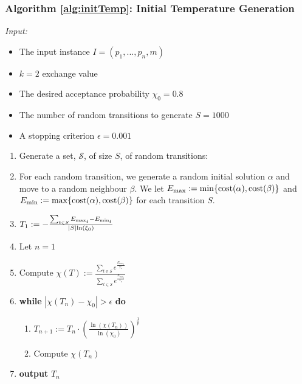 \documentclass[12pt,a4paper,reqno]{article}
\begin{document}
\subsubsection*{Algorithm \ref{alg:initTemp}: Initial Temperature Generation}
\label{alg:initTemp}
\emph{Input:}
\begin{itemize}
  \item The input instance $I=(p_1,...,p_n,m)$
  \item $k=2$ exchange value
  \item The desired acceptance probability $\chi_0 = 0.8$
  \item The number of random transitions to generate $S = 1000$
  \item A stopping criterion $\epsilon = 0.001$
\end{itemize}
\begin{enumerate}
  \item Generate a set, $\mathcal{S}$, of size $S$, of random transitions:
  \item[] For each random transition, we generate a random initial solution $\alpha$ and move to a random neighbour $\beta$. We let $E_\textnormal{max} := \min\{\textnormal{cost}(\alpha),\textnormal{cost}(\beta)\}$ and $E_{\textnormal{min}} := \max\{\textnormal{cost}(\alpha),\textnormal{cost}(\beta)\}$ for each transition $S$.
  \item $T_1:= - \frac{\sum_{t \in S} E_{\textnormal{max}_t} - E_{\textnormal{min}_t}}{|S| \textnormal{ln}(\xi_0)}$
  \item[] Let $n=1$
  \item[] Compute $\chi(T):=\frac{\displaystyle\sum\limits_{t\in \mathcal{S}} e^\frac{E_{{max}_{t}}}{T_n}}{\displaystyle\sum\limits_{t\in \mathcal{S}} e^\frac{E_{{min}_{t}}}{T_n}}$
  \item \textbf{while} $|\chi(T_n)-\chi_0|>\epsilon$ \textbf{do}
  \begin{enumerate}
    \item $T_{n+1} := T_{n} \cdot(\frac{\ln(\chi(T_n))}{\ln(\chi_0)})^{\frac{1}{p}}$
    \item Compute $\chi(T_n)$
  \end{enumerate}
  \item \textbf{output} $T_n$
\end{enumerate}
\end{document}
